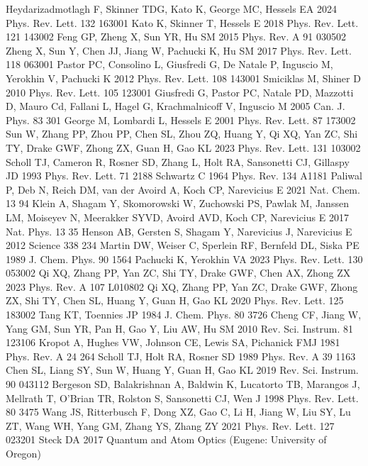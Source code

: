 \documentclass[12pt,a4paper]{article}
\begin{document}
\begin{thebibliography}{99}
 Heydarizadmotlagh F, Skinner TDG, Kato K, George MC, Hessels EA 2024 Phys. Rev. Lett. 132 163001
 Kato K, Skinner T, Hessels E 2018 Phys. Rev. Lett. 121 143002
 Feng GP, Zheng X, Sun YR, Hu SM 2015 Phys. Rev. A 91 030502
 Zheng X, Sun Y, Chen JJ, Jiang W, Pachucki K, Hu SM 2017 Phys. Rev. Lett. 118 063001
 Pastor PC, Consolino L, Giusfredi G, De Natale P, Inguscio M, Yerokhin V, Pachucki K 2012 Phys. Rev. Lett. 108 143001
 Smiciklas M, Shiner D 2010 Phys. Rev. Lett. 105 123001
 Giusfredi G, Pastor PC, Natale PD, Mazzotti D, Mauro Cd, Fallani L, Hagel G, Krachmalnicoff V, Inguscio M 2005 Can. J. Phys. 83 301
 George M, Lombardi L, Hessels E 2001 Phys. Rev. Lett. 87 173002
 Sun W, Zhang PP, Zhou PP, Chen SL, Zhou ZQ, Huang Y, Qi XQ, Yan ZC, Shi TY, Drake GWF, Zhong ZX, Guan H, Gao KL 2023 Phys. Rev. Lett. 131 103002
 Scholl TJ, Cameron R, Rosner SD, Zhang L, Holt RA, Sansonetti CJ, Gillaspy JD 1993 Phys. Rev. Lett. 71 2188
 Schwartz C 1964 Phys. Rev. 134 A1181
 Paliwal P, Deb N, Reich DM, van der Avoird A, Koch CP, Narevicius E 2021 Nat. Chem. 13 94
 Klein A, Shagam Y, Skomorowski W, Zuchowski PS, Pawlak M, Janssen LM, Moiseyev N, Meerakker SYVD, Avoird AVD, Koch CP, Narevicius E 2017 Nat. Phys. 13 35
 Henson AB, Gersten S, Shagam Y, Narevicius J, Narevicius E 2012 Science 338 234
 Martin DW, Weiser C, Sperlein RF, Bernfeld DL, Siska PE 1989 J. Chem. Phys. 90 1564
 Pachucki K, Yerokhin VA 2023 Phys. Rev. Lett. 130 053002
 Qi XQ, Zhang PP, Yan ZC, Shi TY, Drake GWF, Chen AX, Zhong ZX 2023 Phys. Rev. A 107 L010802
 Qi XQ, Zhang PP, Yan ZC, Drake GWF, Zhong ZX, Shi TY, Chen SL, Huang Y, Guan H, Gao KL 2020 Phys. Rev. Lett. 125 183002
 Tang KT, Toennies JP 1984 J. Chem. Phys. 80 3726
 Cheng CF, Jiang W, Yang GM, Sun YR, Pan H, Gao Y, Liu AW, Hu SM 2010 Rev. Sci. Instrum. 81 123106
 Kropot A, Hughes VW, Johnson CE, Lewis SA, Pichanick FMJ 1981 Phys. Rev. A 24 264
 Scholl TJ, Holt RA, Rosner SD 1989 Phys. Rev. A 39 1163
 Chen SL, Liang SY, Sun W, Huang Y, Guan H, Gao KL 2019 Rev. Sci. Instrum. 90 043112
 Bergeson SD, Balakrishnan A, Baldwin K, Lucatorto TB, Marangos J, Mellrath T, O'Brian TR, Rolston S, Sansonetti CJ, Wen J 1998 Phys. Rev. Lett. 80 3475
 Wang JS, Ritterbusch F, Dong XZ, Gao C, Li H, Jiang W, Liu SY, Lu ZT, Wang WH, Yang GM, Zhang YS, Zhang ZY 2021 Phys. Rev. Lett. 127 023201
 Steck DA 2017 Quantum and Atom Optics (Eugene: University of Oregon)
\end{thebibliography}
\end{document}
